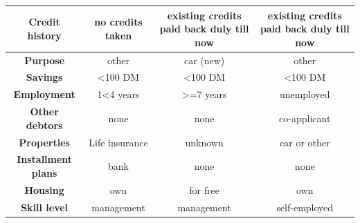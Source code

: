 \documentclass[preprint,12pt]{elsarticle}
\begin{document}
\begin{table}
{\begin{tabular}{|c|c|c|c|}
		\textbf{Credit history}                                  & no   credits taken         & existing credits paid back duly till now &  existing credits paid back duly till now \\ \hline
		\textbf{Purpose}                                         & other                      & car (new)                                                                            & other                                                                                \\ \hline
		\textbf{Savings}                                         & \textless{}100 DM          & \textless{}100 DM                                                                    & \textless{}100 DM                                                                    \\ \hline
		\textbf{Employment}                                      & 1\textless{}4 years        & \textgreater{}=7 years                                                               & unemployed                                                                           \\ \hline
		\textbf{Other debtors}                                   & none                       & none                                                                                 & co-applicant                                                                         \\ \hline
		\textbf{Properties}                                      & Life insurance             & unknown                                                                              & car or other                                                                         \\ \hline
		\textbf{Installment plans}                               & bank                       & none                                                                                 & none                                                                                 \\ \hline
		\textbf{Housing}                                         & own                        & for free                                                                             & own                                                                                  \\ \hline
		\textbf{Skill level}                                     & management                 & management                                                                           & self-employed                                                                        \\ \hline

\end{tabular}}
\end{table}
\end{document}
